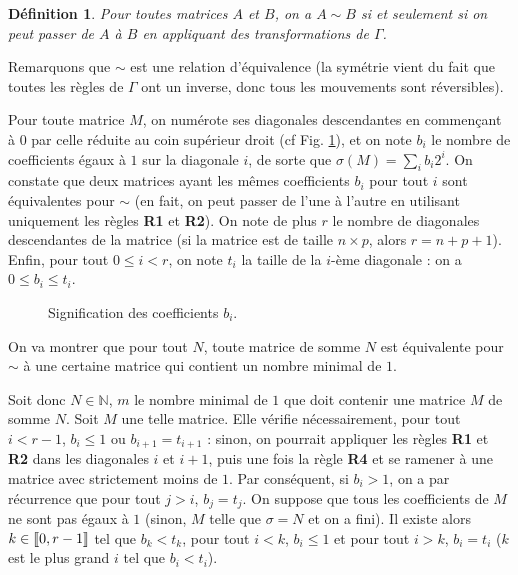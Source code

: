 \documentclass[11pt, openany]{article}
\newtheorem*{df*}{ \textbf{Définition}}{}
\newcommand{\cg }{[\kern-0.15em [}
\newcommand{\cd}{]\kern-0.15em]}
\newcommand{\N}{\mathbb{N}}
\newcommand\tikzmark[1]{%
  \tikz[overlay,remember picture,baseline] 
  \node[anchor=base](#1){};}
\begin{document}
\begin{df*}
Pour toutes matrices $A$ et $B$, on a $A\sim B$ si et seulement si on peut passer de $A$ à $B$ en appliquant des transformations de $\Gamma$.
\end{df*}

Remarquons que $\sim$ est une relation d'équivalence (la symétrie vient du fait que toutes les règles de $\Gamma$ ont un inverse, donc tous les mouvements sont réversibles).

Pour toute matrice $M$, on numérote ses diagonales descendantes en commençant à $0$ par celle réduite au coin supérieur droit (cf Fig. \ref{fig:diags}), et on note $b_i$ le nombre de coefficients égaux à $1$ sur la diagonale $i$, de sorte que $\sigma (M) = \sum\limits_ib_i2^i$. On constate que deux matrices ayant les mêmes coefficients $b_i$ pour tout $i$ sont équivalentes pour $\sim$ (en fait, on peut passer de l'une à l'autre en utilisant uniquement les règles \textbf{R1} et \textbf{R2}). On note de plus $r$ le nombre de diagonales descendantes de la matrice (si la matrice est de taille $n\times p$, alors $r = n+p+1$). Enfin, pour tout $0\leq i < r$, on note $t_i$ la taille de la $i$-ème diagonale : on a $0\leq b_i \leq t_i$. 
 


\begin{figure}[hbt]
\centering


\caption{Signification des coefficients $b_i$.}
\label{fig:diags}
\end{figure}

On va montrer que pour tout $N$, toute matrice de somme $N$ est équivalente pour $\sim$ à une certaine matrice qui contient un nombre minimal de $1$.

Soit donc $N \in \N$, $m$ le nombre minimal de $1$ que doit contenir une matrice $M$ de somme $N$. Soit $M$ une telle matrice. Elle vérifie nécessairement, pour tout $i<r-1$, $b_i \leq 1$ ou $b_{i+1}=t_{i+1}$ : sinon, on pourrait appliquer les règles \textbf{R1} et \textbf{R2} dans les diagonales $i$ et $i+1$, puis une fois la règle \textbf{R4} et se ramener à une matrice avec strictement moins de $1$.
Par conséquent, si $b_i > 1$, on a par récurrence que pour tout $j>i$, $b_j = t_j$.
On suppose que tous les coefficients de $M$ ne sont pas égaux à $1$ (sinon, $M$ telle que $\sigma = N$ et on a fini).
Il existe alors $k \in \cg 0, r-1 \cd$ tel que $b_k<t_k$, pour tout  $i<k$, $b_i \leq 1$ et pour tout $i>k$, $b_i=t_i$ ($k$ est le plus grand $i$ tel que $b_i < t_i$).
\end{document}
